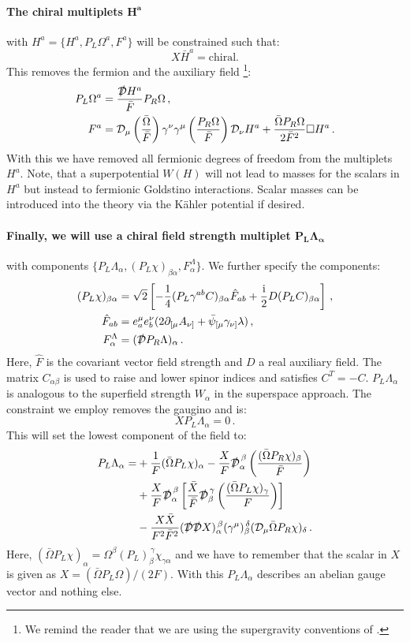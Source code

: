 \documentclass[a4paper,12pt]{report}
\newcommand{\be}{\begin{equation}}
\newcommand{\ee}{\end{equation}}
\newcommand{\bea}{\begin{equation}\begin{aligned}}
\newcommand{\eea}{\end{aligned}\end{equation}}
\def\rmi{{\rm i}}
\begin{document}
\paragraph{The chiral multiplets $\mathbf{H^a}$} with $H^a =\{H^a,P_L \Omega^a,F^a\}$ will be constrained such that:
\be 
X\bar{H}^a = \text{chiral.}
\ee
This removes the fermion and the auxiliary field \cite{Komargodski:2009rz}\footnote{We remind the reader that we are using the supergravity conventions of \cite{Freedman:2012zz}.}:
\bea
P_L\Omega^a &= \frac{\slashed{\mathcal{D}} H^a}{\bar{F}} P_R \Omega\,,\\
F^a &= \mathcal{D}_\mu \left(\frac{\bar{\Omega}}{\bar{F}}\right) \gamma^\nu \gamma^\mu \left(\frac{P_R\Omega}{\bar{F}} \right)\mathcal{D}_\nu H^a + \frac{\bar{\Omega}P_R\Omega}{2\bar{F}^2} \square H^a\,.
\eea
With this we have removed all fermionic degrees of freedom from the multiplets $H^a$. Note, that a superpotential $W(H)$ will not lead to masses for the scalars in $H^a$ but instead to fermionic Goldstino interactions. Scalar masses can be introduced into the theory via the Kähler potential if desired.
\paragraph{Finally, we will use a chiral field strength multiplet $\mathbf{P_L \Lambda_\alpha}$} with components $\{P_L \Lambda_\alpha,(P_L\chi)_{\beta\alpha},F^\Lambda_\alpha\}$. We further specify the components:
\bea 
(P_L\chi)_{\beta\alpha} &= \sqrt{2}\left[-\frac{1}{4} (P_L \gamma^{ab} C)_{\beta \alpha}\hat{F}_{ab} + \frac{\rmi}{2} D(P_LC)_{\beta\alpha}\right]\,,\\
\hat{F}_{ab} &= e^\mu_a e^\nu_b (2 \partial_{[\mu} A_{\nu]} + \bar{\psi}_{[\mu}\gamma_{\nu]}\lambda)\,,\\
F_\alpha^\Lambda &= (\slashed{\mathcal{D}}P_R \Lambda)_\alpha\,.
\label{eq:fieldstrencomp}
\eea
Here, $\hat{F}$ is the covariant vector field strength and $D$ a real auxiliary field. The matrix $C_{\alpha\beta}$ is used to raise and lower spinor indices and satisfies $C^T = -C$. $P_L \Lambda_\alpha$ is analogous to the superfield strength $W_\alpha $ in the superspace approach. The constraint we employ removes the gaugino and is:
\be 
X P_L \Lambda_\alpha = 0\,.
\label{eq:fermconst}
\ee
This will set the lowest component of the field to:
\bea
P_L \Lambda_\alpha = &+\frac{1}{F} (\bar{\Omega}P_L\chi)_\alpha - \frac{X}{F} \slashed{\mathcal{D}}_\alpha^{\,\beta} \left(\frac{(\bar{\Omega} P_R\chi)_\beta}{\bar{F}}\right)\\
&+\frac{X}{F}\slashed{\mathcal{D}}_\alpha^{\,\beta} \left[ \frac{\bar{X}}{\bar{F}} \slashed{\mathcal{D}}_\beta^{\,\gamma} \left(\frac{(\bar{\Omega}P_L\chi)_\gamma}{F}\right)\right]\\
&-\frac{X\bar{X}}{F^2\bar{F}^2} (\slashed{\mathcal{D}}\slashed{\mathcal{D}}X)_\alpha^{\,\beta} (\gamma^\mu)_\beta^{\,\delta}(\mathcal{D}_\mu\bar{\Omega}P_R\chi)_\delta\,.
\eea
Here, $(\bar{\Omega}P_L\chi)_\alpha = \Omega^\beta(P_L)_\beta^{\,\gamma} \chi_{\gamma\alpha}$ and we have to remember that  the scalar in $X$ is given as $X = (\bar{\Omega} P_L \Omega)/(2F)$. With this $P_L \Lambda_\alpha$ describes an abelian gauge vector and nothing else.
\end{document}
